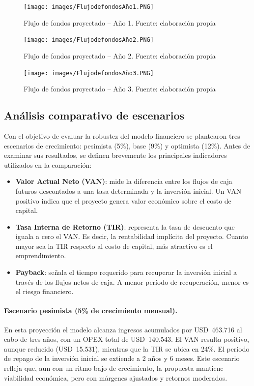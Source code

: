 \begin{figure}[!htbp]
  \centering
  \texttt{[image: images/FlujodefondosAño1.PNG]}
  \caption{Flujo de fondos proyectado -- Año 1. Fuente: elaboración propia}
  \label{fig:flujo-anio1}
\end{figure}

\begin{figure}[!htbp]
  \centering
  \texttt{[image: images/FlujodefondosAño2.PNG]}
  \caption{Flujo de fondos proyectado -- Año 2. Fuente: elaboración propia}
  \label{fig:flujo-anio2}
\end{figure}

\begin{figure}[!htbp]
  \centering
  \texttt{[image: images/FlujodefondosAño3.PNG]}
  \caption{Flujo de fondos proyectado -- Año 3. Fuente: elaboración propia}
  \label{fig:flujo-anio3}
\end{figure}



\subsection{Análisis comparativo de escenarios}

Con el objetivo de evaluar la robustez del modelo financiero se plantearon tres escenarios de crecimiento: pesimista (5\%), base (9\%) y optimista (12\%). Antes de examinar sus resultados, se definen brevemente los principales indicadores utilizados en la comparación:

\begin{itemize}
  \item \textbf{Valor Actual Neto (VAN)}: mide la diferencia entre los flujos de caja futuros descontados a una tasa determinada y la inversión inicial. Un VAN positivo indica que el proyecto genera valor económico sobre el costo de capital.
  \item \textbf{Tasa Interna de Retorno (TIR)}: representa la tasa de descuento que iguala a cero el VAN. Es decir, la rentabilidad implícita del proyecto. Cuanto mayor sea la TIR respecto al costo de capital, más atractivo es el emprendimiento.
  \item \textbf{Payback}: señala el tiempo requerido para recuperar la inversión inicial a través de los flujos netos de caja. A menor período de recuperación, menor es el riesgo financiero.
\end{itemize}

\paragraph{Escenario pesimista (5\% de crecimiento mensual).}  
En esta proyección el modelo alcanza ingresos acumulados por USD~463.716 al cabo de tres años, con un OPEX total de USD~140.543. El VAN resulta positivo, aunque reducido (USD~15.531), mientras que la TIR se ubica en 24\%. El período de repago de la inversión inicial se extiende a 2 años y 6 meses. Este escenario refleja que, aun con un ritmo bajo de crecimiento, la propuesta mantiene viabilidad económica, pero con márgenes ajustados y retornos moderados.

